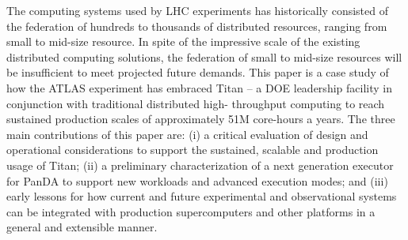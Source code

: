 The computing systems used by LHC experiments has historically consisted of
the federation of hundreds to thousands of distributed resources, ranging
from small to mid-size resource.  In spite of the impressive scale of the
existing distributed computing solutions, the federation of small to mid-size
resources will be insufficient to meet projected future demands. This paper
is a case study of how the ATLAS experiment has embraced Titan -- a DOE
leadership facility in conjunction with traditional distributed high-
throughput computing to reach sustained production scales of approximately
51M core-hours a years. The three main contributions of this paper are:  (i)
a critical evaluation of design and operational considerations  to support
the sustained, scalable and production usage of Titan;  (ii) a preliminary
characterization of a next generation executor for PanDA to support new
workloads and  advanced execution modes; and (iii) early lessons for how
current and future experimental and observational systems can be integrated
with production supercomputers and other platforms in a general and
extensible manner.
